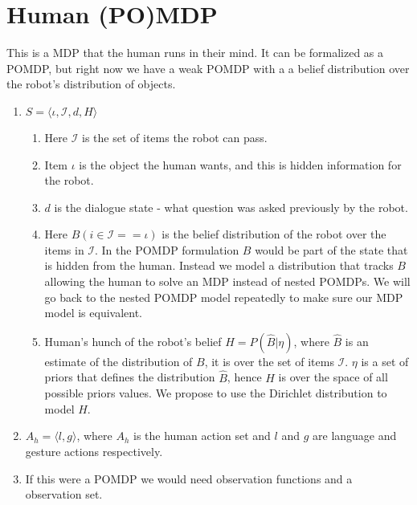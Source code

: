 \documentclass{article}
\begin{document}
\section{Human (PO)MDP}
This is a MDP that the human runs in their mind. It can be formalized as a POMDP, but right now we have a weak POMDP with a a belief distribution over the robot's distribution of objects.




\begin{enumerate}

	\item $S = \langle \iota, \mathcal{I}, d, H \rangle$
	\begin{enumerate}
	\item Here $\mathcal{I}$ is the set of items the robot can pass. 
	\item Item $\iota$ is the object the human wants, and this is hidden information for the robot. 
	\item $d$ is the dialogue state - what question was asked previously by the robot.
	\item Here $B(i \in \mathcal{I} == \iota)$ is the belief distribution of the robot over the items in $\mathcal{I}$. In the POMDP formulation $B$ would be part of the state that is hidden from the human. Instead we model a distribution that tracks $B$ allowing the human to solve an MDP instead of nested POMDPs. We will go back to the nested POMDP model repeatedly to make sure our MDP model is equivalent.
	
	\item Human's hunch of the robot's belief $H = P(\widehat{B}| \eta)$, where $\widehat{B}$ is an estimate of the distribution of $B$, it is over the set of items $\mathcal{I}$. $\eta$ is a set of priors that defines the distribution $\widehat{B}$, hence $H$ is over the space of all possible priors values. We propose to use the Dirichlet distribution to model $H$.  
	
	\end{enumerate}
	

	\item $A_h = \langle l,g \rangle$, where $A_h$ is the human action set and $l$ and $g$ are language and gesture actions respectively.
	
	\item If this were a POMDP we would need observation functions and a observation set. \begin{enumerate}
	
	


\end{enumerate}
\end{enumerate}
\end{document}
